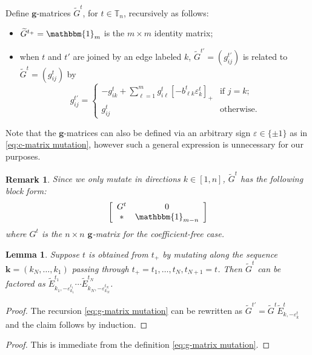 \documentclass{amsart}
\newtheorem{lemma}[theorem]{Lemma}
\newtheorem{remark}[theorem]{Remark}
\numberwithin{theorem}{section}
\newcommand{\bfg}{{\boldsymbol{g}}}
\newcommand{\bfk}{{\boldsymbol{k}}}
\newcommand{\TT}{\mathbb{T}}
\newcommand{\bOne}{\mathbbm{1}}
\begin{document}
  Define $\bfg$-matrices $\widetilde G^t$, for $t\in\TT_n$, recursively as follows:
  \begin{itemize}
    \item $\widetilde G^{t_+} = \bOne_m$ is the $m\times m$ identity matrix;
    \item when $t$ and $t'$ are joined by an edge labeled $k$, $\widetilde G^{t'}=(g^{t'}_{ij})$ is related to $\widetilde G^t=(g^t_{ij})$ by
      \begin{equation}
        \label{eq:g-matrix mutation}
        g^{t'}_{ij} = \begin{cases} -g^t_{ik} + \sum\limits_{\ell=1}^m g^t_{i\ell} [-b^t_{\ell k} \varepsilon^t_k]_+ & \text{if $j=k$;}\\ g^t_{ij} & \text{otherwise.} \end{cases}
      \end{equation}
  \end{itemize}
  Note that the $\bfg$-matrices can also be defined via an arbitrary sign $\varepsilon\in\{\pm 1\}$ as in \eqref{eq:c-matrix mutation}, however such a general expression is unnecessary for our purposes.
  \begin{remark}
    Since we only mutate in directions $k\in[1,n]$, $\widetilde G^t$ has the following block form:
    \[\left[\begin{array}{cc} G^t & 0\\ * & \bOne_{m-n}\end{array}\right]\]
    where $G^t$ is the $n\times n$ $\bfg$-matrix for the coefficient-free case.
  \end{remark}

  \begin{lemma}
    \label{le:g-matrix factorization}
    Suppose $t$ is obtained from $t_+$ by mutating along the sequence $\bfk=(k_N,\ldots,k_1)$ passing through $t_+=t_1,\ldots,t_N,t_{N+1}=t$.
    Then $\widetilde G^t$ can be factored as $\widetilde E^{t_1}_{k_1,-\varepsilon^{t_1}_{k_1}}\cdots \widetilde E^{t_N}_{k_N,-\varepsilon^{t_N}_{k_N}}$.
  \end{lemma}
  \begin{proof}
    The recursion \eqref{eq:g-matrix mutation} can be rewritten as $\widetilde G^{t'}=\widetilde G^t \widetilde E^t_{k,-\varepsilon^t_k}$ and the claim follows by induction.
  \end{proof}
  \begin{proof}
    This is immediate from the definition \eqref{eq:g-matrix mutation}.
  \end{proof}
\end{document}
